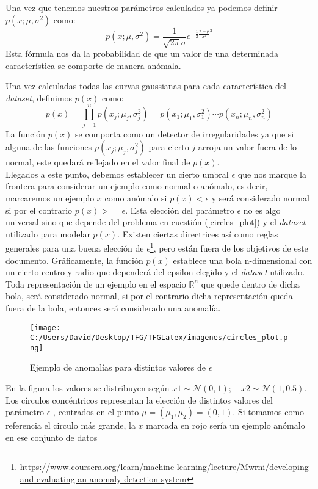 \noindent Una vez que tenemos nuestros parámetros calculados ya podemos definir $p(x;\mu,\sigma^2)$ como:
$$ p(x;\mu,\sigma^2) = \frac{1}{\sqrt{2\pi}\sigma}e^{-\frac{1}{2}\frac{x-\mu}{\sigma^2}^2}$$
Esta fórmula nos da la probabilidad de que un valor de una determinada característica se 
comporte de manera anómala.

\clearpage

Una vez calculadas todas las curvas gaussianas para cada característica del \textit{dataset}, definimos $p(x)$ como:
$$ p(x) = \prod_{j=1}^n p(x_j;\mu_j,\sigma_j^2)= p(x_1; \mu_1, \sigma_1^2) \cdots  p(x_n; \mu_n, \sigma_n^2)$$
La función $p(x)$ se comporta como un detector de irregularidades ya que si alguna de las funciones 
$p(x_j;\mu_j,\sigma_j^2)$ para cierto $j$ arroja un valor fuera de lo normal, este quedará reflejado 
en el valor final de $p(x)$.\\
Llegados a este punto, debemos establecer un cierto umbral $\epsilon$ que nos marque la frontera 
para considerar un ejemplo como normal o anómalo, es decir, marcaremos un ejemplo $x$ como anómalo si 
$p(x)<\epsilon$ y será considerado normal si por el contrario $p(x)>=\epsilon$.
Esta elección del parámetro $\epsilon$ no es algo universal sino que depende del problema en cuestión 
(\autoref{circles_plot}) y el \textit{dataset} utilizado para modelar $p(x)$.
Existen ciertas directrices así como reglas generales para una buena elección de 
$\epsilon$\footnote{\url{https://www.coursera.org/learn/machine-learning/lecture/Mwrni/developing-and-evaluating-an-anomaly-detection-system}}, pero están fuera de los objetivos de este documento.
\newline
Gráficamente, la función $p(x)$ establece una bola n-dimensional con un cierto centro 
y radio que dependerá del epsilon elegido y el \textit{dataset} utilizado. Toda representación 
de un ejemplo en el espacio $\mathds{R}^n$ que quede dentro de dicha bola, será considerado normal, 
si por el contrario dicha representación queda fuera de la bola, entonces será considerado una 
anomalía.

\begin{figure}[h]
  \centering
  \texttt{[image: C:/Users/David/Desktop/TFG/TFGLatex/imagenes/circles\_plot.png]}
  \caption[Ejemplo de anomalía]{Ejemplo de anomalías para distintos valores de $\epsilon$}
  \label{circles_plot}
\end{figure}

En la figura los valores se distribuyen según
$x1 \sim \mathcal{N}(0, 1); \quad x2 \sim \mathcal{N}(1, 0.5)$.
Los círculos concéntricos representan la elección de distintos valores del parámetro $\epsilon$ ,
centrados en el punto $\mu=(\mu_1, \mu_2)=(0, 1)$.
Si tomamos como referencia el circulo más grande, la $x$ marcada en rojo sería un ejemplo anómalo 
en ese conjunto de datos

